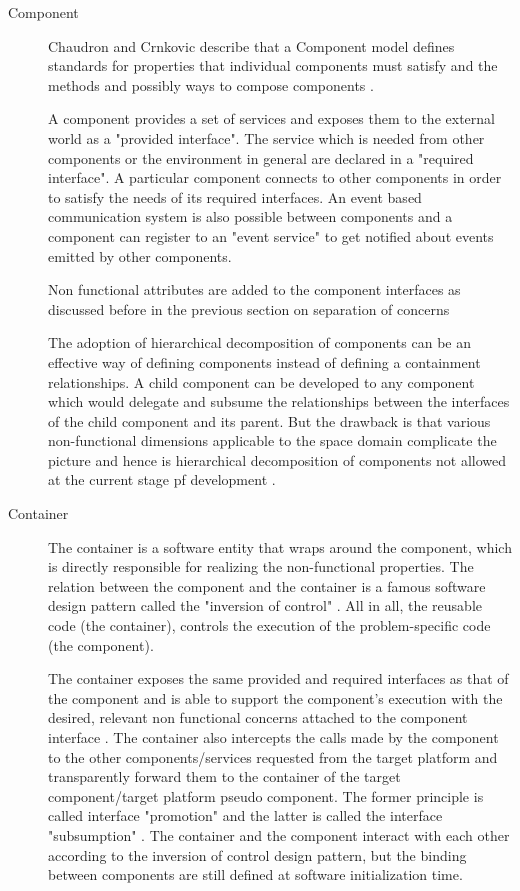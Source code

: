 \begin{description}
\item[Component] Chaudron and Crnkovic describe that a Component model defines standards for properties that individual components must satisfy and the methods and possibly ways to compose components \cite{CompBasedProcess}.

A component provides a set of services and exposes them to the external world as a "provided interface". The service which is needed from other components or the environment in general are declared in a "required interface". A particular component connects to other components in order to satisfy the needs of its required interfaces. An event based communication system is also possible between components and a component can register to an "event service" to get notified about events emitted by other components.

Non functional attributes are added to the component interfaces as discussed before in the previous section on separation of concerns

The adoption of hierarchical decomposition of components can be an effective way of defining components instead of defining a containment relationships. A child component can be developed to any component which would delegate and subsume the relationships between the interfaces of the child component and its parent. But the drawback is that various non-functional dimensions applicable to the space domain complicate the picture and hence is hierarchical decomposition of components not allowed at the current stage pf development \cite{PhdThesis}.
    
\item [Container] The container is a software entity that wraps around the component, which is directly responsible for realizing the non-functional properties. The relation between the component and the container is a famous software design pattern called the "inversion of control" \cite{CompBasedProcess} \cite{InvOfCntrlurl}. All in all, the reusable code (the container), controls the execution of the problem-specific code (the component).

The container exposes the same provided and required interfaces as that of the component and is able to support the component's execution with the desired, relevant non functional concerns attached to the component interface \cite{CompBasedDev}. The container also intercepts the calls made by the component to the other components/services requested from the target platform and transparently forward them to the container of the target component/target platform pseudo component. The former principle is called interface "promotion" and the latter is called the interface "subsumption" \cite{CompBasedDev}. The container and the component interact with each other according to the inversion of control design pattern, but the binding between components are still defined at software initialization time.


\end{description}
